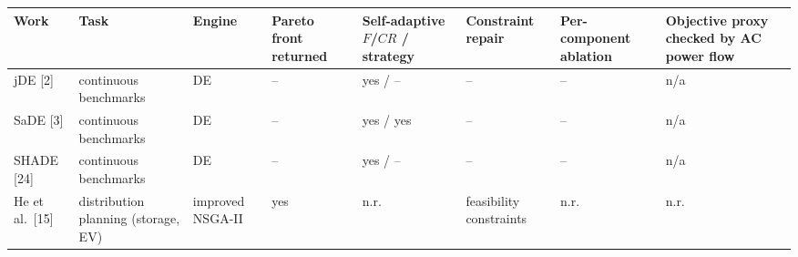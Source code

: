 \documentclass[
  10pt,
  a4paper,
]{article}
\begin{document}
\begin{longtable}[]{@{}
  >{\raggedright\arraybackslash}p{}
  >{\raggedright\arraybackslash}p{}
  >{\raggedright\arraybackslash}p{}
  >{\raggedright\arraybackslash}p{}
  >{\raggedright\arraybackslash}p{}
  >{\raggedright\arraybackslash}p{}
  >{\raggedright\arraybackslash}p{}
  >{\raggedright\arraybackslash}p{}@{}}
\toprule\noalign{}
\begin{minipage}[b]{\linewidth}\raggedright
Work
\end{minipage} & \begin{minipage}[b]{\linewidth}\raggedright
Task
\end{minipage} & \begin{minipage}[b]{\linewidth}\raggedright
Engine
\end{minipage} & \begin{minipage}[b]{\linewidth}\raggedright
Pareto front returned
\end{minipage} & \begin{minipage}[b]{\linewidth}\raggedright
Self-adaptive \(F\)/\(CR\) / strategy
\end{minipage} & \begin{minipage}[b]{\linewidth}\raggedright
Constraint repair
\end{minipage} & \begin{minipage}[b]{\linewidth}\raggedright
Per-component ablation
\end{minipage} & \begin{minipage}[b]{\linewidth}\raggedright
Objective proxy checked by AC power flow
\end{minipage} \\
\midrule\noalign{}
\endhead
\bottomrule\noalign{}
\endlastfoot
jDE {[}2{]} & continuous benchmarks & DE & -- & yes / -- & -- & -- &
n/a \\
SaDE {[}3{]} & continuous benchmarks & DE & -- & yes / yes & -- & -- &
n/a \\
SHADE {[}24{]} & continuous benchmarks & DE & -- & yes / -- & -- & -- &
n/a \\
He et al.~{[}15{]} & distribution planning (storage, EV) & improved
NSGA-II & yes & n.r. & feasibility constraints & n.r. & n.r. \\

\end{longtable}
\end{document}
